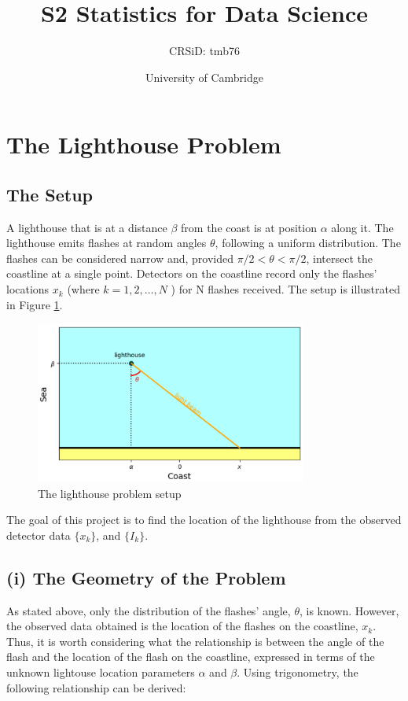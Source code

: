 \documentclass[12pt]{report} %
\title{S2 Statistics for Data Science}
\author{CRSiD: tmb76}
\date{University of Cambridge}
\begin{document}
\maketitle

\tableofcontents

\chapter*{The Lighthouse Problem}

\section*{The Setup}

\indent A lighthouse that is at a distance $\beta$ from the coast is at position $\alpha$ along it. The lighthouse emits flashes at random angles $\theta$, following a uniform distribution. The flashes can be considered narrow and, provided $\pi/2 < \theta < \pi/2$, intersect the coastline at a single point. Detectors on the coastline record only the flashes' locations $x_{k}$ (where $k = 1, 2,\dots, N$ ) for N flashes received. The setup is illustrated in Figure \ref{fig:lighthouse}.

\begin{figure}[h]
\centering
\includegraphics[width=0.8\textwidth]{../Plots/lighthouse diagram.png}
\caption{The lighthouse problem setup}
\label{fig:lighthouse}
\end{figure}


The goal of this project is to find the location of the lighthouse from the observed detector data $\{x_{k}\}$, and $\{I_{k}\}$.

\section*{(i) The Geometry of the Problem}

As stated above, only the distribution of the flashes' angle, $\theta$, is known. However, the observed data obtained is the location of the flashes on the coastline, $x_{k}$. Thus, it is worth considering what the relationship is between the angle of the flash and the location of the flash on the coastline, expressed in terms of the unknown lightouse location parameters $\alpha$ and $\beta$. Using trigonometry, the following relationship can be derived:
\end{document}
